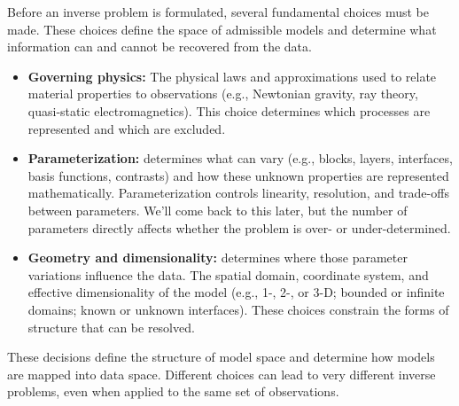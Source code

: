 Before an inverse problem is formulated, several fundamental choices must be made.  These choices define the space of admissible models and determine what information can and cannot be recovered from the data.
\begin{itemize}
    \item \textbf{Governing physics:}
    The physical laws and approximations used to relate material properties to observations (e.g., Newtonian gravity, ray theory, quasi-static electromagnetics).  This choice determines which processes are represented and which are excluded.

    \item \textbf{Parameterization:}
    determines what can vary (e.g., blocks, layers, interfaces, basis functions, contrasts) and how these unknown properties are represented mathematically. Parameterization controls linearity, resolution, and trade-offs between parameters. We'll come back to this later, but the number of parameters directly affects whether the problem is over- or under-determined.

    \item \textbf{Geometry and dimensionality:}
    determines where those parameter variations influence the data.
    The spatial domain, coordinate system, and effective dimensionality of the model (e.g., 1-, 2-, or 3-D; bounded or infinite domains; known or unknown interfaces).  These choices constrain the forms of structure that can be resolved.
\end{itemize}

These decisions define the structure of model space and determine how models are mapped into data space. Different choices can lead to very different inverse problems, even when applied to the same set of observations.


